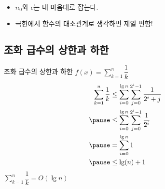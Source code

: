 \documentclass[10pt]{beamer}
\begin{document}
\begin{frame}{}
    \begin{itemize}
        \item $n_0$와 $c$는 내 마음대로 잡는다.
        \pause
        \item 극한에서 함수의 대소관계로 생각하면 제일 편함!
    \end{itemize}
\end{frame}    


\subsection{조화 급수의 상한과 하한}


\begin{frame}{조화 급수의 상한과 하한}
    $f(x) = \sum_{k=1}^n \dfrac{1}{k}$
    \pause
    \[
        \begin{aligned}
        \sum_{k=1}^n \dfrac{1}{k} 
        &\le \sum_{i=0}^{\lg n} \sum _{j=0}^{2^i-1} \dfrac{1}{2^i+j} \\ \pause
        &\le \sum_{i=0}^{\lg n} \sum _{j=0}^{2^i-1} \dfrac{1}{2^i} \\  \pause
        &=\sum_{i=0}^{\lg n} 1 \\ \pause 
        &\le \lg(n) + 1
        \end{aligned}
    \]
    $\sum_{k=1}^{n} \dfrac{1}{k} = O(\lg n)$
\end{frame}
\end{document}
